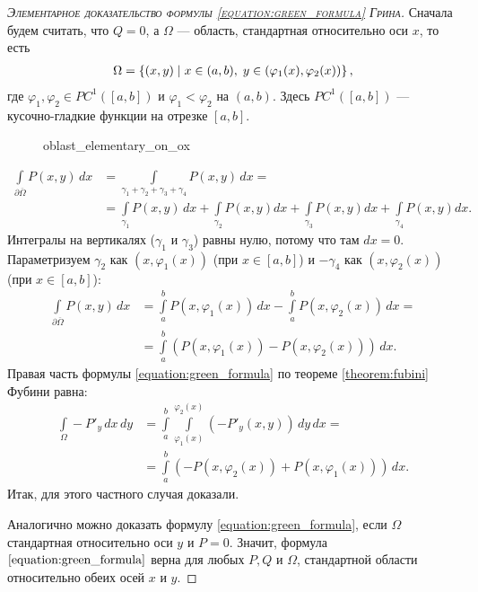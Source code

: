 \begin{proof}[\normalfont\textsc{Элементарное доказательство формулы \eqref{equation:green_formula} Грина}]
 Сначала будем считать, что $Q = 0$, а $\Omega$ --- область, стандартная относительно оси $x$, то есть \begin{align*}
  \Omega = \left\{ (x, y) \;\middle|\; x \in (a, b),\; y \in (\varphi_1(x), \varphi_2(x)) \right\}
 ,\end{align*} где $\varphi_1, \varphi_2 \in PC^{1}([a, b])$ и $\varphi_1 < \varphi_2$ на $(a, b)$. Здесь $PC^{1}([a,b])$ --- кусочно-гладкие функции на отрезке $[a,b]$.

\begin{figure}[ht]
    \centering
    \caption{oblast_elementary_on_ox}
    \label{fig:oblast_elementary_on_ox}
\end{figure}

\begin{align*}
 \int\limits_{\partial \overline \Omega} P(x,y) \, dx  &= \int\limits_{\gamma_1 + \gamma_2 + \gamma_3 + \gamma_4} P(x,y) \, dx = \\
 &= \int\limits_{\gamma_1} P(x,y)\,dx + \int\limits_{\gamma_2} P(x,y) dx + \int\limits_{\gamma_3} P(x,y) dx + \int\limits_{\gamma_4} P(x,y) dx
.\end{align*} Интегралы на вертикалях ($\gamma_1$ и $\gamma_3$) равны нулю, потому что там $dx = 0$.  Параметризуем $\gamma_2$ как $(x, \varphi_1(x))$ (при $x \in [a,b]$) и $-\gamma_4$ как $(x, \varphi_2(x))$ (при $x \in [a,b]$):
\begin{align*}
 \int\limits_{\partial \overline \Omega} P(x,y)\,dx &= \int\limits_{a}^{b} P(x, \varphi_1(x)) \, dx - \int\limits_{a}^{b} P(x, \varphi_2(x)) \, dx  = \\
 &= \int\limits_{a}^{b} (P(x, \varphi_1(x)) - P(x, \varphi_2(x))) \, dx 
.\end{align*} Правая часть формулы \eqref{equation:green_formula} по теореме \ref{theorem:fubini} Фубини равна:
\begin{align*}
 \int\limits_{\Omega} -P'_y \, dx \, dy &= \int\limits_{a}^{b} \int\limits_{\varphi_1(x)}^{\varphi_2(x)} (-P'_y(x,y)) \, dy \, dx = \\
 &= \int\limits_{a}^{b} \left( -P(x, \varphi_2(x)) + P(x, \varphi_1(x)) \right) \, dx 
.\end{align*} Итак, для этого частного случая доказали.

Аналогично можно доказать формулу \eqref{equation:green_formula}, если $\Omega$ стандартная относительно оси $y$ и $P = 0$. Значит, формула $\eqref{equation:green_formula}$ верна для любых $P, Q$ и $\Omega$, стандартной области относительно обеих осей $x$ и $y$.


\end{proof}
